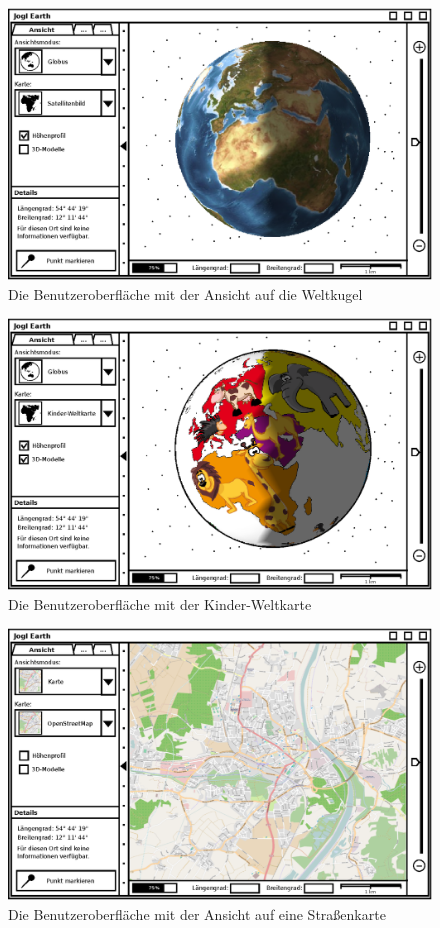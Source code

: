 \documentclass[10pt]{scrreprt}
\begin{document}
\begin{figure}
	\centering
	\includegraphics[scale=0.9]{GUI-Ansicht-Welt.eps}
	\caption{Die Benutzeroberfläche mit der Ansicht auf die Weltkugel}
\end{figure}
\begin{figure}
	\centering
	\includegraphics[scale=0.9]{GUI-Ansicht-Kinder-Weltkarte.eps}
	\caption{Die Benutzeroberfläche mit der Kinder-Weltkarte}
\end{figure}
\begin{figure}
	\centering
	\includegraphics[scale=0.9]{GUI-Ansicht-Strassenkarte.eps}
	\caption{Die Benutzeroberfläche mit der Ansicht auf eine Straßenkarte}
\end{figure}
\end{document}
